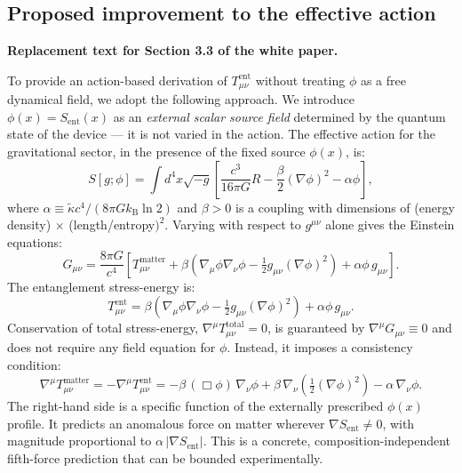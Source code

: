 \documentclass[12pt,letterpaper]{article}
\theoremstyle{plain}
\theoremstyle{definition}
\theoremstyle{remark}
\newcommand{\kB}{k_{\mathrm{B}}}
\newcommand{\Sent}{S_{\mathrm{ent}}}
\begin{document}
\subsection{Proposed improvement to the effective action}

\begin{improvebox}
\textbf{Replacement text for Section 3.3 of the white paper.}

To provide an action-based derivation of $T^{\mathrm{ent}}_{\mu\nu}$ without treating $\phi$ as a free dynamical field, we adopt the following approach. We introduce $\phi(x) = \Sent(x)$ as an \emph{external scalar source field} determined by the quantum state of the device --- it is not varied in the action. The effective action for the gravitational sector, in the presence of the fixed source $\phi(x)$, is:
\begin{equation}
  S[g;\phi]
  = \int d^4x\sqrt{-g}
    \left[
      \frac{c^3}{16\pi G}R
      - \frac{\beta}{2}(\nabla\phi)^2
      - \alpha\phi
    \right],
  \label{eq:action-fixed}
\end{equation}
where $\alpha \equiv \tilde{\kappa}c^4/(8\pi G\kB\ln 2)$ and $\beta > 0$ is a coupling with dimensions of (energy density) $\times$ (length/entropy$)^2$. Varying with respect to $g^{\mu\nu}$ alone gives the Einstein equations:
\begin{equation}
  G_{\mu\nu}
  = \frac{8\pi G}{c^4}\left[
    T^{\mathrm{matter}}_{\mu\nu}
    + \beta\!\left(\nabla_\mu\phi\nabla_\nu\phi
    - \tfrac{1}{2}g_{\mu\nu}(\nabla\phi)^2\right)
    + \alpha\phi\,g_{\mu\nu}
  \right].
  \label{eq:EFE-improved}
\end{equation}
The entanglement stress-energy is:
\begin{equation}
  T^{\mathrm{ent}}_{\mu\nu}
  = \beta\!\left(\nabla_\mu\phi\nabla_\nu\phi
  - \tfrac{1}{2}g_{\mu\nu}(\nabla\phi)^2\right)
  + \alpha\phi\,g_{\mu\nu}.
  \label{eq:Tent-improved}
\end{equation}
Conservation of total stress-energy, $\nabla^\mu T^{\mathrm{total}}_{\mu\nu} = 0$, is guaranteed by $\nabla^\mu G_{\mu\nu} \equiv 0$ and does not require any field equation for $\phi$. Instead, it imposes a consistency condition:
\begin{equation}
  \nabla^\mu T^{\mathrm{matter}}_{\mu\nu}
  = -\nabla^\mu T^{\mathrm{ent}}_{\mu\nu}
  = -\beta\,(\Box\phi)\,\nabla_\nu\phi
    + \beta\,\nabla_\nu\!\left(\tfrac{1}{2}(\nabla\phi)^2\right)
    - \alpha\,\nabla_\nu\phi.
  \label{eq:matter-conservation}
\end{equation}
The right-hand side is a specific function of the externally prescribed $\phi(x)$ profile. It predicts an anomalous force on matter wherever $\nabla\Sent \neq 0$, with magnitude proportional to $\alpha\,|\nabla\Sent|$. This is a concrete, composition-independent fifth-force prediction that can be bounded experimentally.


\end{improvebox}
\end{document}
